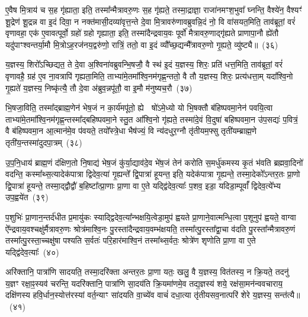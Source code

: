 ए॒वैष मि॒त्राय॑ च स॒ह गृ॑ह्याता॒ इति॒ तस्मा᳚न्मैत्रावरु॒णः स॒ह गृ॑ह्यते॒ तस्मा॒द्राज्ञा॒ राजा॑नमꣳश॒भुवा᳚ घ्नन्ति॒ वैश्ये॑न॒ वैश्यꣳ॑ शू॒द्रेण॑ शू॒द्रन्न वा इ॒दं दिवा॒ न नक्त॑मासी॒दव्या॑वृत्त॒न्ते दे॒वा मि॒त्रावरु॑णावब्रुवन्नि॒दं नो॒ वि वा॑सयत॒मिति॒ ताव॑ब्रूतां॒ वरं॑ वृणावहा॒ एक॑ ए॒वावत्पूर्वो॒ ग्रहो॑ ग्रहो गृह्याता॒ इति॒ तस्मा॑दैन्द्रवाय॒वः पूर्वो॑ मैत्रावरु॒णाद्गृ॑ह्यते प्राणापा॒नौ ह्ये॑तौ यदु॑पाꣳश्वन्तर्या॒मौ मि॒त्रो\-ऽह॒रज॑नय॒द्वरु॑णो॒ रात्रिं॒ ततो॒ वा इ॒दं व्यौ᳚च्छ॒द्यन्मै᳚त्रावरु॒णो गृ॒ह्यते॒ व्यु॑ष्ट्यै॥~(३६)

{\anuvakamend[{ए॒ष चै᳚न्द्रवाय॒वो द्वाविꣳ॑शतिश्च}]}%

य॒ज्ञस्य॒ शिरो᳚\-ऽच्छिद्यत॒ ते दे॒वा अ॒श्विना॑वब्रुवन्भि॒षजौ॒ वै स्थ॑ इ॒दं य॒ज्ञस्य॒ शिरः॒ प्रति॑ धत्त॒मिति॒ ताव॑ब्रूतां॒ वरं॑ वृणावहै॒ ग्रह॑ ए॒व ना॒वत्रापि॑ गृह्यता॒मिति॒ ताभ्या॑मे॒तमा᳚श्वि॒नम॑गृह्ण॒न्ततो॒ वै तौ य॒ज्ञस्य॒ शिरः॒ प्रत्य॑धत्ता॒म् यदा᳚श्वि॒नो गृ॒ह्यते॑ य॒ज्ञस्य॒ निष्कृ॑त्यै॒ तौ दे॒वा अ॑ब्रुव॒न्नपू॑तौ॒ वा इ॒मौ म॑नुष्यच॒रौ~(३७)

भि॒षजा॒विति॒ तस्मा᳚द्ब्राह्म॒णेन॑ भेष॒जं न का॒र्य॑मपू॑तो॒ ह्ये  षो॑\-ऽमे॒ध्यो यो भि॒षक्तौ ब॑हिष्पवमा॒नेन॑ पवयि॒त्वा ताभ्या॑मे॒तमा᳚श्वि॒नम॑गृह्ण॒न्तस्मा᳚द्बहिष्पवमा॒ने स्तु॒त आ᳚श्वि॒नो गृ॑ह्यते॒ तस्मा॑दे॒वं वि॒दुषा॑ बहिष्पवमा॒न उ॑प॒सद्यः॑ प॒वित्रं॒ वै ब॑हिष्पवमा॒न आ॒त्मान॑मे॒व प॑वयते॒ तयो᳚स्त्रे॒धा भैष॑ज्यं॒ वि न्य॑दधुर॒ग्नौ तृ॑तीयम॒फ्सु तृती॑यम्ब्राह्म॒णे तृती॑य॒न्तस्मा॑दुदपा॒त्रम्~(३८)

उ॒प॒नि॒धाय॑ ब्राह्म॒णं द॑क्षिण॒तो नि॒षाद्य॑ भेष॒जं कु॑र्या॒द्याव॑दे॒व भे॑ष॒जं तेन॑ करोति स॒मर्धु॑कमस्य कृ॒तं भ॑वति ब्रह्मवा॒दिनो॑ वदन्ति॒ कस्मा᳚थ्स॒त्यादेक॑पात्रा द्विदेव॒त्या॑ गृ॒ह्यन्ते᳚ द्वि॒पात्रा॑ हूयन्त॒ इति॒ यदेक॑पात्रा गृ॒ह्यन्ते॒ तस्मा॒देको᳚\-ऽन्तर॒तः प्रा॒णो द्वि॒पात्रा॑ हूयन्ते॒ तस्मा॒द्द्वौद्वौ॑ ब॒हिष्टा᳚त्प्रा॒णाः प्रा॒णा वा ए॒ते यद्द्वि॑देव॒त्याः᳚ प॒शव॒ इडा॒ यदिडा॒म्पूर्वां᳚ द्विदेव॒त्ये᳚भ्य उप॒ह्वये॑त~(३९)

प॒शुभिः॑ प्रा॒णान॒न्तर्द॑धीत प्र॒मायु॑कः स्याद्द्विदेव॒त्या᳚न्भक्षयि॒त्वेडा॒मुप॑ ह्वयते प्रा॒णाने॒वात्मन्धि॒त्वा प॒शूनुप॑ ह्वयते॒ वाग्वा ऐ᳚न्द्रवाय॒वश्चक्षु॑र्मैत्रावरु॒णः श्रोत्र॑माश्वि॒नः पु॒रस्ता॑दैन्द्रवाय॒वम्भ॑क्षयति॒ तस्मा᳚त्पु॒रस्ता᳚द्वा॒चा व॑दति पु॒रस्ता᳚न्मैत्रावरु॒णं तस्मा᳚त्पु॒रस्ता॒च्चक्षु॑षा पश्यति स॒र्वतः॑ परि॒हार॑माश्वि॒नं तस्मा᳚थ्स॒र्वतः॒ श्रोत्रे॑ण शृणोति प्रा॒णा वा ए॒ते यद्द्वि॑देव॒त्याः᳚~(४०)

अरि॑क्तानि॒ पात्रा॑णि सादयति॒ तस्मा॒दरि॑क्ता अन्तर॒तः प्रा॒णा यतः॒ खलु॒ वै य॒ज्ञस्य॒ वित॑तस्य॒ न क्रि॒यते॒ तदनु॑ य॒ज्ञꣳ रक्षा॒ꣴ॒स्यव॑ चरन्ति॒ यदरि॑क्तानि॒ पात्रा॑णि सा॒दय॑ति क्रि॒यमा॑णमे॒व तद्य॒ज्ञस्य॑ शये॒ रक्ष॑सा॒मन॑न्ववचाराय॒ दक्षि॑णस्य हवि॒र्धान॒स्योत्त॑रस्यां वर्त॒न्याꣳ सा॑दयति वा॒च्ये॑व वाचं॑ दधा॒त्या तृ॑तीयसव॒नात्परि॑ शेरे य॒ज्ञस्य॒ सन्त॑त्यै॥~(४१)

